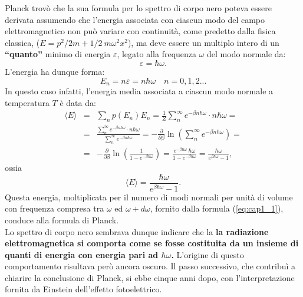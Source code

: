 Planck trovò che la sua formula  per lo spettro di corpo nero poteva essere derivata assumendo che l'energia associata con ciascun modo del campo elettromagnetico non può variare con continuità, come predetto dalla fisica classica, ($E= p^2/2m +1/2 \ m \omega ^2 x^2$), ma deve essere un multiplo intero di un \textbf{``quanto''} minimo di energia $\varepsilon$, legato alla frequenza $\omega$ del modo normale da:
	\begin{equation}
		\boxed{\boxed{
			\varepsilon = \hbar \omega .
			}}
	\end{equation}
L'energia ha dunque forma:
	\begin{equation}
	\boxed{\boxed{
		E_n = n\varepsilon = n \hbar \omega \quad n= 0,1,2...
		}}
\end{equation}
In questo caso infatti, l'energia media associata a ciascun modo normale a temperatura $T$ è data da:
	\begin{eqnarray}
		\langle E \rangle &=&\sum _n p(E_n) E_n =\frac{1}{Z}\sum _n ^{\infty} e^{-\beta n \hbar \omega} \cdot n\hbar \omega = \nonumber \\
		&=&\frac{\sum _n ^{\infty} e^{-\beta n \hbar \omega} \cdot n\hbar \omega}{\sum _n ^{\infty} e^{-\beta n \hbar \omega}}= - \frac{\partial}{\partial \beta} \ln \left( \sum _n ^{\infty} e^{-\beta n \hbar \omega}\right)= \nonumber \\
		&=&- \frac{\partial}{\partial \beta} \ln \left( \frac{1}{1- e^{-\beta \hbar \omega}}\right)=  \frac{e^{-\beta \hbar \omega}\ \hbar \omega}{1-e^{-\beta \hbar \omega}}= \frac{ \hbar \omega}{e^{\beta \hbar \omega}-1},
	\end{eqnarray}
ossia
	\begin{equation}
		\boxed{\boxed{
			\langle E \rangle = \frac{ \hbar \omega}{e^{\beta \hbar \omega}-1}.
			}}
	\end{equation}
Questa energia, moltiplicata per il numero di modi normali per unità di volume con frequenza compresa tra $\omega$ ed $\omega + d\omega$, fornito dalla formula (\ref{eq:cap1_1}), conduce alla formula di Planck.\\

Lo spettro di corpo nero sembrava dunque indicare che la \textbf{la radiazione elettromagnetica si comporta come se fosse costituita da un insieme di quanti di energia con energia pari ad $\hbar \omega $.}
L'origine di questo comportamento risultava però ancora oscuro. Il passo successivo, che contribuì a chiarire la conclusione di Planck, si ebbe cinque anni dopo, con l'interpretazione fornita da Einstein dell'effetto fotoelettrico.
